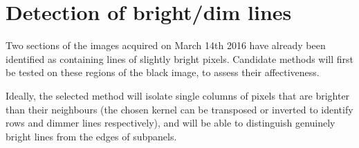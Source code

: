 \documentclass[10pt,fleqn]{article}
\begin{document}



\section*{Detection of bright/dim lines}

Two sections of the images acquired on March 14th 2016 have already been identified as containing lines of slightly bright pixels. Candidate methods will first be tested on these regions of the black image, to assess their affectiveness.

Ideally, the selected method will isolate single columns of pixels that are brighter than their neighbours (the chosen kernel can be transposed or inverted to identify rows and dimmer lines respectively), and will be able to distinguish genuinely bright lines from the edges of subpanels.
\end{document}
